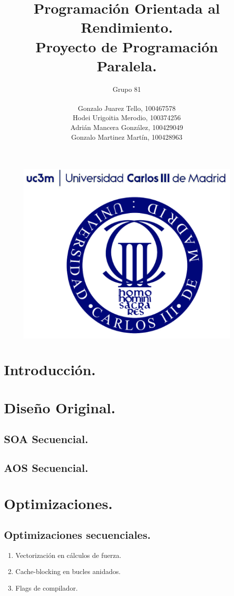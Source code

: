 \documentclass{article}
\title{Programación Orientada al Rendimiento.\\Proyecto de Programación Paralela.}
\author{Grupo 81\\ \\
	Gonzalo Juarez Tello, 100467578\\
	Hodei Urigoitia Merodio, 100374256\\
	Adrián Mancera González, 100429049\\
	Gonzalo Martinez Martín, 100428963
}
\date{}
\begin{document}
\begin{figure}
	\includegraphics[width=\linewidth,height=0.7\textwidth]{resources/logo_uc3m.png}
\end{figure}
\maketitle
\newpage

\tableofcontents
\newpage

\section{Introducción.\label{intro}}

\section{Diseño Original.\label{original}}
\subsection{SOA Secuencial.}
\subsection{AOS Secuencial.}

\section{Optimizaciones.\label{opt}}
\subsection{Optimizaciones secuenciales.\label{opt_seq}}
\begin{enumerate}
\item Vectorización en cálculos de fuerza.
\item Cache-blocking en bucles anidados.
\item Flags de compilador.
\end{enumerate}
\end{document}
